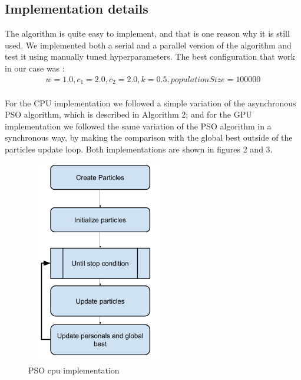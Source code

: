 \documentclass[journal,onecolumn]{IEEEtran}
\begin{document}
\subsection{ \textbf{Implementation details} }

The algorithm is quite easy to implement, and that is one reason why it is still used. We implemented both a serial and a parallel version of the algorithm and test it using manually tuned hyperparameters. The best configuration that work in our case was :
\\
\begin{gather}
    w = 1.0,c_{1} = 2.0, c_{2} = 2.0, k = 0.5, populationSize = 100000
\end{gather}
\\
For the CPU implementation we followed a simple variation of the asynchronous PSO algorithm, which is described in Algorithm 2; and for the GPU implementation we followed the same variation of the PSO algorithm in a synchronous way, by making the comparison with the global best outside of the particles update loop. Both implementations are shown in figures 2 and 3.

\begin{figure}[H]
\centering
\captionsetup{justification=centering}
\includegraphics[width=2.5in,height=3.5in]{_img/img_PSO_algorithm_cpu.png}
\caption{PSO cpu implementation}
\end{figure}
\end{document}
